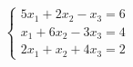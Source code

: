 \documentclass[preview]{standalone}
\begin{document}
\begin{align*}
\begin{cases}5x_1 + 2x_2 - x_3 = 6 \\x_1 + 6x_2 - 3x_3 = 4 \\2x_1 + x_2 + 4x_3 = 2\end{cases}
\end{align*}
\end{document}
